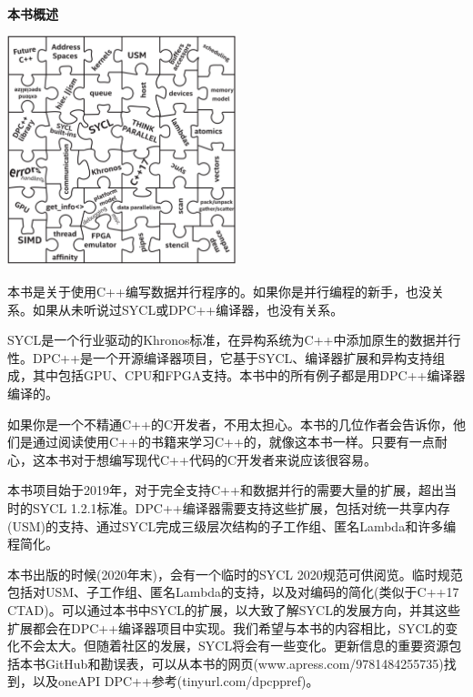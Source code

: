 \documentclass[11pt,a4paper,UTF8]{ctexart}
\begin{document}
	\hspace*{\fill} \\ %
	\noindent\textbf{本书概述}\ \par
	\begin{center}
		\includegraphics[width=0.5\textwidth]{images/Preface}
	\end{center} \par
	本书是关于使用C++编写数据并行程序的。如果你是并行编程的新手，也没关系。如果从未听说过SYCL或DPC++编译器，也没有关系。\par
	
	SYCL是一个行业驱动的Khronos标准，在异构系统为C++中添加原生的数据并行性。DPC++是一个开源编译器项目，它基于SYCL、编译器扩展和异构支持组成，其中包括GPU、CPU和FPGA支持。本书中的所有例子都是用DPC++编译器编译的。\par
	
	如果你是一个不精通C++的C开发者，不用太担心。本书的几位作者会告诉你，他们是通过阅读使用C++的书籍来学习C++的，就像这本书一样。只要有一点耐心，这本书对于想编写现代C++代码的C开发者来说应该很容易。\par
	
	本书项目始于2019年，对于完全支持C++和数据并行的需要大量的扩展，超出当时的SYCL 1.2.1标准。DPC++编译器需要支持这些扩展，包括对统一共享内存(USM)的支持、通过SYCL完成三级层次结构的子工作组、匿名Lambda和许多编程简化。\par
	
	本书出版的时候(2020年末)，会有一个临时的SYCL 2020规范可供阅览。临时规范包括对USM、子工作组、匿名Lambda的支持，以及对编码的简化(类似于C++17 CTAD)。可以通过本书中SYCL的扩展，以大致了解SYCL的发展方向，并其这些扩展都会在DPC++编译器项目中实现。我们希望与本书的内容相比，SYCL的变化不会太大。但随着社区的发展，SYCL将会有一些变化。更新信息的重要资源包括本书GitHub和勘误表，可以从本书的网页(www.apress.com/9781484255735)找到，以及oneAPI DPC++参考(tinyurl.com/dpcppref)。\par
	
\end{document}
